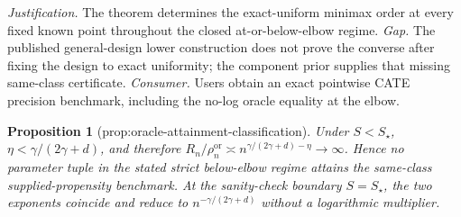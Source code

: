 \documentclass{article}
\newtheorem{proposition}{Proposition}
\begin{document}
\par\smallskip\noindent \textit{Justification.} The theorem determines the exact-uniform minimax order at every fixed known point throughout the closed at-or-below-elbow regime. \textit{Gap.} The published general-design lower construction does not prove the converse after fixing the design to exact uniformity; the component prior supplies that missing same-class certificate. \textit{Consumer.} Users obtain an exact pointwise CATE precision benchmark, including the no-log oracle equality at the elbow.

\begin{proposition}[prop:oracle-attainment-classification]\label{prop:oracle-attainment-classification}
Under \(S<S_{\star}\), \(\eta<\gamma/(2\gamma+d)\), and therefore \(R_n/\rho_n^{\mathrm{or}}\asymp n^{\gamma/(2\gamma+d)-\eta}\to\infty\). Hence no parameter tuple in the stated strict below-elbow regime attains the same-class supplied-propensity benchmark. At the sanity-check boundary \(S=S_{\star}\), the two exponents coincide and reduce to \(n^{-\gamma/(2\gamma+d)}\) without a logarithmic multiplier.
\end{proposition}
\end{document}
